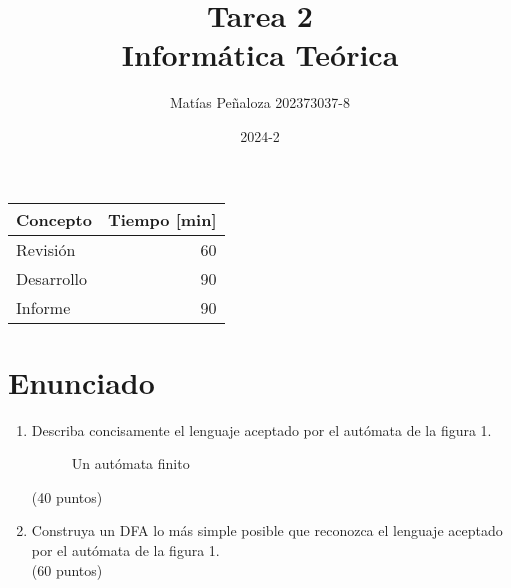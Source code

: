 \documentclass[spanish]{article}
\begin{document}
\title{
    Tarea 2 \\
    Informática Teórica
}
\author{
    Matías Peñaloza
    202373037-8
}
\date{
    2024-2
}
\maketitle

\begin{center}
  \begin{tabular}{|l|r|}
    \hline
    \multicolumn{1}{|c|}{\textbf{Concepto}} &
      \multicolumn{1}{c|}{\textbf{Tiempo [min]}} \\
    \hline
    Revisión & 60\\
    \hline
    Desarrollo    & 90\\
    \hline
    Informe	      & 90\\
    \hline
  \end{tabular}
\end{center}

\section{Enunciado}
\begin{enumerate}
  \item %
    Describa concisamente el lenguaje aceptado por el autómata
    de la figura 1.
    \begin{figure}[ht]
      \centering
      \caption{Un autómata finito}
      \label{fig:20242t2p1}
    \end{figure}
    \hspace*{\fill}(40 puntos)
  \item %
    Construya un DFA lo más simple posible
    que reconozca el lenguaje aceptado
    por el autómata de la figura 1.
    \\ \hspace*{\fill}(60 puntos)
  \end{enumerate}
  
\end{document}
